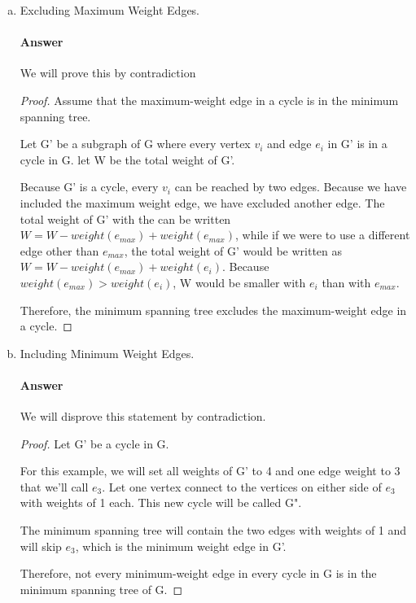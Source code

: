 \documentclass{article}
\begin{document}
\begin{enumerate}[(a)]

    \item Excluding Maximum Weight Edges.

        \paragraph{Answer}

        We will prove this by contradiction

        \begin{proof}

            Assume that the maximum-weight edge in a cycle is in the minimum spanning
            tree.

            Let G' be a subgraph of G where every vertex $v_{i}$ and edge $e_{i}$ in G'
            is in a cycle in G. let W be the total weight of G'.

            Because G' is a cycle, every $v_{i}$ can be reached by two edges.
            Because we have included the maximum weight edge, we have excluded
            another edge. The total weight of G' with the can be written $W = W -
            weight(e_{max}) + weight(e_{max})$, while if we were to use a different
            edge other than $e_{max}$, the total weight of G' would be written as
            $W = W - weight(e_{max}) + weight(e_{i})$. Because $weight(e_{max}) > weight(e_{i})$, W would be smaller with $e_{i}$ than with $e_{max}$.

            Therefore, the minimum spanning tree excludes the maximum-weight
            edge in a cycle.

        \end{proof}


    \item Including Minimum Weight Edges.

        \paragraph{Answer}

        We will disprove this statement by contradiction.

        \begin{proof}
            Let G' be a cycle in G.

            For this example, we will set all weights of G' to 4 and one edge
            weight to 3 that we'll call $e_{3}$. Let one vertex connect to the vertices on either side
            of $e_{3}$ with weights of 1 each. This new cycle will be called G".

            The minimum spanning tree will contain the two edges with weights of 1
            and will skip $e_{3}$, which is the minimum weight edge in G'.

            Therefore, not every minimum-weight edge in every cycle in G is in
            the minimum spanning tree of G.
        \end{proof}

\end{enumerate}
\end{document}
